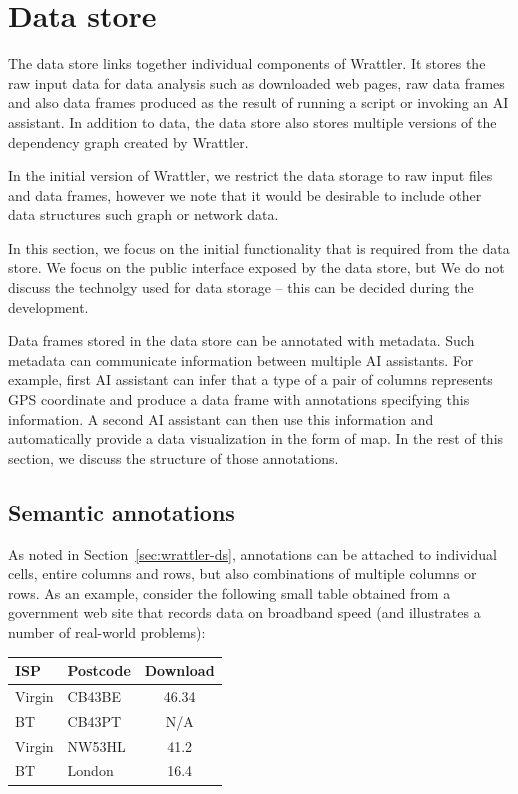 \documentclass[sigplan,preprint,10pt]{acmart}\settopmatter{printfolios=true,printccs=false,printacmref=false}
\theoremstyle{plain}
\theoremstyle{definition}
\begin{document}
{\section{Data store}
\label{sec:datastore}

The data store links together individual components of Wrattler. It stores the raw input
data for data analysis such as downloaded web pages, raw data frames and also data frames
produced as the result of running a script or invoking an AI assistant. In addition to data,
the data store also stores multiple versions of the dependency graph created by Wrattler.

In the initial version of Wrattler, we restrict the data storage to raw input files and
data frames, however we note that it would be desirable to include other data structures
such graph or network data.

In this section, we focus on the initial functionality that is required from the data store.
We focus on the public interface exposed by the data store, but We do not discuss the technolgy
used for data storage -- this can be decided during the development.

Data frames stored in the data store can be annotated with metadata. Such metadata can
communicate information between multiple AI assistants. For example, first AI assistant can
infer that a type of a pair of columns represents GPS coordinate and produce a data frame
with annotations specifying this information. A second AI assistant can then use this information
and automatically provide a data visualization in the form of map. In the rest of this section,
we discuss the structure of those annotations.

\subsection{Semantic annotations}
As noted in Section~\ref{sec:wrattler-ds}, annotations can be attached to individual cells,
entire columns and rows, but also combinations of multiple columns or rows. As an example,
consider the following small table obtained from a government web site that records data 
on broadband speed (and illustrates a number of real-world problems):

\vspace{1em}
\begin{tabular}{llc}
\toprule
\textbf{ISP}\qquad\qquad\qquad & \textbf{Postcode}\qquad\qquad & \textbf{Download} \\
\midrule
Virgin & CB43BE & 46.34 \\
BT & CB43PT & N/A \\
Virgin & NW53HL & 41.2 \\
BT & London & 16.4 \\
\bottomrule
\end{tabular}
\vspace{1em}

}
\end{document}
